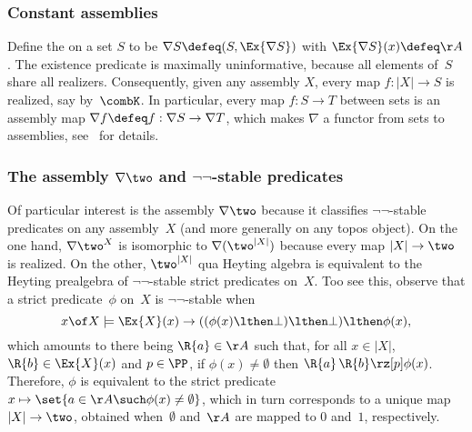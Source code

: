 \subsubsection{Constant assemblies}
\label{sec:constant-assemblies}

Define the  on a set $S$ to be $\nabla S \defeq (S, \Ex{\nabla S})$ with $\Ex{\nabla S}(x) \defeq \AA$.
%
The existence predicate is maximally uninformative, because all elements of~$S$ share all realizers.
%
Consequently, given any assembly $X$, every map $f : |X| \to S$ is realized, say by~$\combK$.
In particular, every map $f : S \to T$ between sets is an assembly map $\nabla f \defeq f : \nabla S \to \nabla T$,
which makes $\nabla$ a functor from sets to assemblies, see~\cite[Sect.~2.4]{oosten08:_realiz} for details.

\subsubsection{The assembly $\nabla\two$ and $\neg\neg$-stable predicates}
\label{sec:assembly-nabl-negn}

Of particular interest is the assembly $\nabla \two$ because it classifies $\neg\neg$-stable predicates on any assembly~$X$ (and more generally on any topos object).
%
On the one hand, ${\nabla\two}^X$ is isomorphic to $\nabla(\two^{|X|})$ because every map $|X| \to \two$ is realized.
On the other, $\two^{|X|}$ qua Heyting algebra is equivalent to the Heyting prealgebra of $\neg\neg$-stable strict predicates on~$X$. Too see this, observe that a strict predicate~$\phi$ on~$X$ is $\neg\neg$-stable when
%
\begin{equation*}
  x \of X \models \Ex{X}(x) \to ((\phi(x) \lthen \bot) \lthen \bot) \lthen \phi(x),
\end{equation*}
%
%
%
%
%
which amounts to there being $\R{a} \in \AA$ such that, for all $x \in |X|$, $\R{b} \in \Ex{X}(x)$ and $p \in \PP$,
if $\phi(x) \neq \emptyset$ then $\R{a} \, \R{b} \rz[p] \phi(x)$.
%
Therefore, $\phi$ is equivalent to the strict predicate
%
$x \mapsto \set{a \in \AA \such \phi(x) \neq \emptyset}$,
%
which in turn corresponds to a unique map $|X| \to \two$, obtained when~$\emptyset$ and~$\AA$ are mapped to $0$ and~$1$, respectively.






 